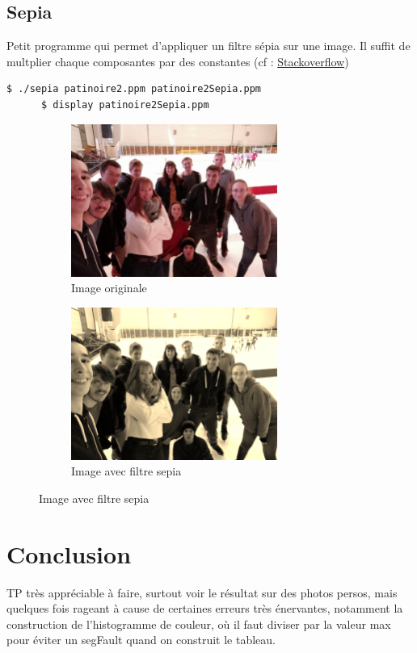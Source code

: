 \documentclass[a4paper,10pt]{article}
\begin{document}
    \subsection{Sepia}
    Petit programme qui permet d'appliquer un filtre sépia sur une image. Il suffit de multplier chaque composantes par des constantes (cf : \href{https://stackoverflow.com/questions/1061093/how-is-a-sepia-tone-created}{Stackoverflow})
    \begin{lstlisting}[language=Bash]
      $ ./sepia patinoire2.ppm patinoire2Sepia.ppm  
      $ display patinoire2Sepia.ppm
    \end{lstlisting}
    \begin{figure}[h]
      \begin{subfigure}{0.6\textwidth}
        \includegraphics[width=1\linewidth, height=5cm]{patinoire2}
        \caption{Image originale}
        \label{fig:patinoire2}
      \end{subfigure}
      \begin{subfigure}{0.6\textwidth}
        \includegraphics[width=1\linewidth, height=5cm]{patinoire2Sepia.jpeg}   
        \caption{Image avec filtre sepia}
        \label{fig:patinoireSepia}
      \end{subfigure}
    \end{figure}
    \section*{Conclusion}
    TP très appréciable à faire, surtout voir le résultat sur des photos persos, mais quelques fois rageant à cause de certaines erreurs très énervantes, notamment la construction de l'histogramme de couleur, où il faut diviser par la valeur max pour éviter un segFault quand on construit le tableau.
\end{document}
